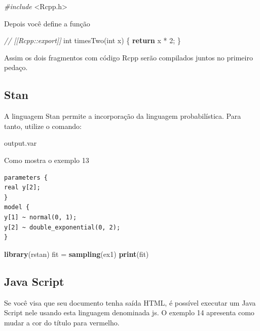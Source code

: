 \documentclass[
]{book}
\newenvironment{Shaded}{\begin{snugshade}}{\end{snugshade}}
\newcommand{\CommentTok}[1]{\textcolor[rgb]{0.56,0.35,0.01}{\textit{#1}}}
\newcommand{\ControlFlowTok}[1]{\textcolor[rgb]{0.13,0.29,0.53}{\textbf{#1}}}
\newcommand{\DataTypeTok}[1]{\textcolor[rgb]{0.13,0.29,0.53}{#1}}
\newcommand{\DecValTok}[1]{\textcolor[rgb]{0.00,0.00,0.81}{#1}}
\newcommand{\ImportTok}[1]{#1}
\newcommand{\KeywordTok}[1]{\textcolor[rgb]{0.13,0.29,0.53}{\textbf{#1}}}
\newcommand{\NormalTok}[1]{#1}
\newcommand{\PreprocessorTok}[1]{\textcolor[rgb]{0.56,0.35,0.01}{\textit{#1}}}
\newcommand{\StringTok}[1]{\textcolor[rgb]{0.31,0.60,0.02}{#1}}
\begin{document}
\begin{Shaded}
\begin{Highlighting}[]
\PreprocessorTok{\#include }\ImportTok{\textless{}Rcpp.h\textgreater{}}
\end{Highlighting}
\end{Shaded}

Depois você define a função

\begin{Shaded}
\begin{Highlighting}[]
\CommentTok{// [[Rcpp::export]]}
\DataTypeTok{int}\NormalTok{ timesTwo(}\DataTypeTok{int}\NormalTok{ x) \{}
\ControlFlowTok{return}\NormalTok{ x * }\DecValTok{2}\NormalTok{;}
\NormalTok{\}}
\end{Highlighting}
\end{Shaded}

Assim os dois fragmentos com código Rcpp serão compilados juntos no primeiro pedaço.

\hypertarget{stan}{%
\subsection{Stan}\label{stan}}

A linguagem Stan permite a incorporação da linguagem probabilística. Para tanto, utilize o comando:

output.var

Como mostra o exemplo 13

\begin{verbatim}
parameters {
real y[2];
}
model {
y[1] ~ normal(0, 1);
y[2] ~ double_exponential(0, 2);
}
\end{verbatim}

\begin{Shaded}
\begin{Highlighting}[]
\KeywordTok{library}\NormalTok{(rstan)}
\NormalTok{fit =}\StringTok{ }\KeywordTok{sampling}\NormalTok{(ex1)}
\KeywordTok{print}\NormalTok{(fit)}
\end{Highlighting}
\end{Shaded}

\hypertarget{java-script}{%
\subsection{Java Script}\label{java-script}}

Se você visa que seu documento tenha saída HTML, é possível executar um Java Script nele usando esta linguagem denominada js.
O exemplo 14 apresenta como mudar a cor do título para vermelho.
\end{document}
